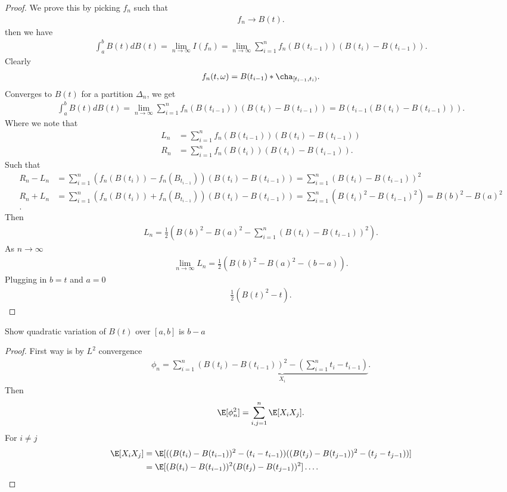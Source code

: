 \begin{proof}
 We prove this by picking $f_n$ such that 
 \begin{align*}
  f_n \to  B(t)
 .\end{align*}
 then we have 
 \begin{align*}
   \int_{a}^{b}  B(t) dB(t) = \lim_{n \to \infty} I(f_n) = \lim_{n \to \infty} \sum_{i=1}^{n}  f_n(B(t_{i-1}))(B(t_i)-B(t_{i-1}))
 .\end{align*}
 Clearly 
 \begin{align*}
   f_n(t,\omega ) = B(t_{i-1})*\cha_{[t_{i-1},t_i)}
 .\end{align*}
 Converges to $B(t)$ for a partition $\Delta_n$, we get
 \begin{align*}
   \int_{a}^{b}  B(t) dB(t) = \lim_{n\to \infty} \sum_{i=1}^{n} f_n(B(t_{i-1}))(B(t_i)-B(t_{i-1})) = B(t_{i-1}(B(t_i)-B(t_{i-1})))
 .\end{align*}
 Where we note that 
 \begin{align*}
   L_n &= \sum_{i=1}^{n} f_n(B(t_{i-1}))(B(t_i)-B(t_{i-1}))\\
  R_n &= \sum_{i=1}^{n} f_n(B(t_{i}))(B(t_i)-B(t_{i-1}))
 .\end{align*}
 Such that 
 \begin{align*}
   R_n - L_n &=  \sum_{i=1}^{n} (f_n(B(t_{i}))-f_n(B_{t_{i-1}}))(B(t_i)-B(t_{i-1})) = \sum_{i=1}^{n} (B(t_i)-B(t_{i-1}))^2 \\
   R_n + L_n &=  \sum_{i=1}^{n} (f_n(B(t_{i}))+f_n(B_{t_{i-1}}))(B(t_i)-B(t_{i-1})) = \sum_{i=1}^{n} (B(t_i)^2-B(t_{i-1})^2) = B(b)^2 - B(a)^2\\
 .\end{align*}
 Then 
 \begin{align*}
   L_n =  \frac{1}{2} (B(b)^2-B(a)^2 -\sum_{i=1}^{n} (B(t_i)-B(t_{i-1}))^2 )
 .\end{align*}
 As $n\to \infty$
 \begin{align*}
   \lim_{n\to \infty} L_n  = \frac{1}{2}(B(b)^2-B(a)^2 -  (b-a))
 .\end{align*}
 Plugging in $b=t$ and $a=0$
 \begin{align*}
  \frac{1}{2}(B(t)^2-t)
 .\end{align*}
\end{proof}
\begin{exercise}
  Show quadratic variation of $B(t)$  over $[a,b]$ is $b-a$
\end{exercise}
\begin{proof}
  First way is by $L^2$ convergence 
 \begin{align*}
   \phi_n = \sum_{i=1}^{n} \underbrace{(B(t_i)-B(t_{i-1}))^2 - (\sum_{i=1}^{n}  t_i-t_{i-1})}_{X_i}
 .\end{align*} 
 Then 
 \begin{align*}
   \E[\phi_n^2] = \sum_{i,j=1}^{n} \E[X_iX_j]
 .\end{align*}
 For $i\neq j$ 
 \begin{align*}
   \E[X_iX_j] &=  \E[((B(t_i)-B(t_{i-1}))^2 - (t_i-t_{i-1}))((B(t_j)-B(t_{j-1}))^2 - (t_j-t_{j-1}))]\\
              &= \E[(B(t_i)-B(t_{i-1}))^2(B(t_j)-B(t_{j-1}))^2] \ldots  
 .\end{align*}
\end{proof}


